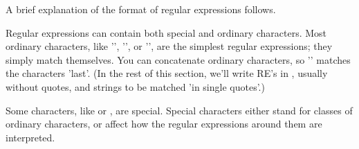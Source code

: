 A brief explanation of the format of regular expressions follows.  

Regular expressions can contain both special and ordinary characters.
Most ordinary characters, like '', '', or '',
are the simplest regular expressions; they simply match themselves.  
You can concatenate ordinary characters, so '' matches the
characters 'last'.  (In the rest of this section, we'll write RE's in
, usually without quotes, and strings to be
matched 'in single quotes'.)

Some characters, like \code{|} or \code{(}, are special.  Special
characters either stand for classes of ordinary characters, or affect
how the regular expressions around them are interpreted.


